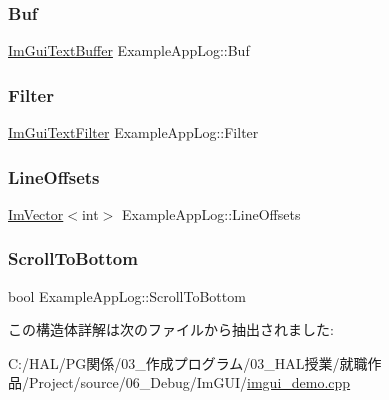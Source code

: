 \subsubsection{\texorpdfstring{Buf}{Buf}}
{\footnotesize\ttfamily \mbox{\hyperlink{struct_im_gui_text_buffer}{Im\+Gui\+Text\+Buffer}} Example\+App\+Log\+::\+Buf}

\mbox{\label{struct_example_app_log_a4571947a6000e984ec8da9b7166e1e2b}} 
\subsubsection{\texorpdfstring{Filter}{Filter}}
{\footnotesize\ttfamily \mbox{\hyperlink{struct_im_gui_text_filter}{Im\+Gui\+Text\+Filter}} Example\+App\+Log\+::\+Filter}

\mbox{\label{struct_example_app_log_af197fca7116f9033a5a5e831ee764ee2}} 
\subsubsection{\texorpdfstring{Line\+Offsets}{LineOffsets}}
{\footnotesize\ttfamily \mbox{\hyperlink{class_im_vector}{Im\+Vector}}$<$int$>$ Example\+App\+Log\+::\+Line\+Offsets}

\mbox{\label{struct_example_app_log_a6834b71563c0595e67b78afb6c7ce39d}} 
\subsubsection{\texorpdfstring{Scroll\+To\+Bottom}{ScrollToBottom}}
{\footnotesize\ttfamily bool Example\+App\+Log\+::\+Scroll\+To\+Bottom}



この構造体詳解は次のファイルから抽出されました\+:\begin{DoxyCompactItemize}
\item 
C\+:/\+H\+A\+L/\+P\+G関係/03\+\_\+作成プログラム/03\+\_\+\+H\+A\+L授業/就職作品/\+Project/source/06\+\_\+\+Debug/\+Im\+G\+U\+I/\mbox{\hyperlink{imgui__demo_8cpp}{imgui\+\_\+demo.\+cpp}}\end{DoxyCompactItemize}
